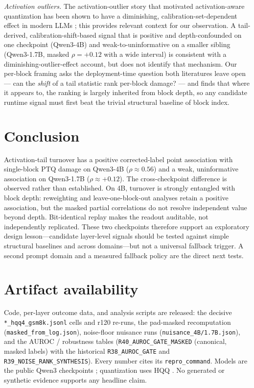 \documentclass{article}
\begin{document}
\emph{Activation outliers.} The activation-outlier story that motivated activation-aware
quantization has been shown to have a diminishing, calibration-set-dependent effect in modern LLMs
\citep{paglieri2024outliers}; this provides relevant context for our observation. A tail-derived,
calibration-shift-based signal that is positive and depth-confounded on one checkpoint (Qwen3-4B)
and weak-to-uninformative on a smaller sibling (Qwen3-1.7B, masked $\rho=+0.12$ with a wide
interval) is consistent with a diminishing-outlier-effect account, but does not identify that
mechanism. Our per-block framing asks the deployment-time
question both literatures leave open --- can the \emph{shift} of a tail statistic rank per-block
damage? --- and finds that where it appears to, the ranking is largely inherited from block depth,
so any candidate runtime signal must first beat the trivial structural baseline of block index.

\section{Conclusion}
\label{sec:conclusion}
Activation-tail turnover has a positive corrected-label point association with single-block PTQ
damage on Qwen3-4B ($\rho\approx0.56$) and a weak, uninformative association on Qwen3-1.7B
($\rho\approx+0.12$). The cross-checkpoint difference is observed rather than established. On 4B,
turnover is strongly entangled with block depth: reweighting and leave-one-block-out analyses retain
a positive association, but the masked partial correlations do not resolve independent value beyond
depth. Bit-identical replay makes the readout auditable, not independently replicated. These two
checkpoints therefore support an exploratory design lesson---candidate layer-level signals should
be tested against simple structural baselines and across domains---but not a universal fallback
trigger. A second prompt domain and a measured fallback policy are the direct next tests.

\section*{Artifact availability}
Code, per-layer outcome data, and analysis scripts are released: the decisive
\texttt{*\_hqq4\_\allowbreak gsm8k.jsonl} cells and r120 re-runs, the pad-masked recomputation
(\texttt{masked\_\allowbreak from\_\allowbreak log.json}), noise-floor nuisance runs
(\texttt{nuisance\_\allowbreak 4B/1.7B.json}), and the AUROC / robustness tables
(\texttt{R40\_\allowbreak AUROC\_\allowbreak GATE\_\allowbreak MASKED} (canonical, masked labels)
with the historical \texttt{R38\_\allowbreak AUROC\_\allowbreak GATE} and
\texttt{R39\_\allowbreak NOISE\_\allowbreak RANK\_\allowbreak SYNTHESIS}).
Every number cites its \texttt{repro\_command}. Models are the public Qwen3 checkpoints
\citep{yang2025qwen3}; quantization uses HQQ \citep{badri2023hqq}. No generated or synthetic
evidence supports any headline claim.
\end{document}
